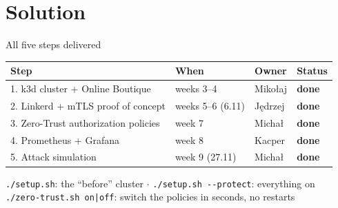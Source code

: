 \documentclass[9pt,aspectratio=169]{beamer}
\begin{document}
\section{Solution}

\begin{frame}{All five steps delivered}
  \centering
  \vspace{4pt}
  \begin{tabular}{llll}
    \toprule
    \textbf{Step} & \textbf{When} & \textbf{Owner} & \textbf{Status} \\
    \midrule
    1. k3d cluster + Online Boutique      & weeks 3--4         & Mikołaj  & \textcolor{AccentGreen}{\textbf{done}} \\
    2. Linkerd + mTLS proof of concept    & weeks 5--6 (6.11)  & Jędrzej  & \textcolor{AccentGreen}{\textbf{done}} \\
    3. Zero-Trust authorization policies  & week 7             & Michał   & \textcolor{AccentGreen}{\textbf{done}} \\
    4. Prometheus + Grafana               & week 8             & Kacper   & \textcolor{AccentGreen}{\textbf{done}} \\
    5. Attack simulation                  & week 9 (27.11)     & Michał   & \textcolor{AccentGreen}{\textbf{done}} \\
    \bottomrule
  \end{tabular}

  \vspace{10pt}
  {\small \texttt{./setup.sh}: the ``before'' cluster \quad$\cdot$\quad
  \texttt{./setup.sh -{}-protect}: everything on\\[2pt]
  \texttt{./zero-trust.sh on|off}: switch the policies in seconds, no restarts}
\end{frame}
\end{document}
